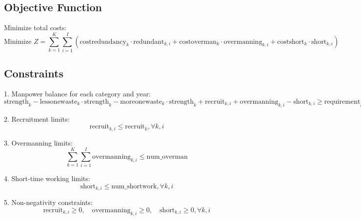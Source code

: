 \documentclass{article}
\begin{document}
\subsection*{Objective Function}
Minimize total costs:
\[
\text{Minimize } Z = \sum_{k=1}^{K} \sum_{i=1}^{I} \left( \text{costredundancy}_{k} \cdot \text{redundant}_{k,i} + \text{costoverman}_{k} \cdot \text{overmanning}_{k,i} + \text{costshort}_{k} \cdot \text{short}_{k,i} \right)
\]

\subsection*{Constraints}

1. Manpower balance for each category and year:
   \[
   \text{strength}_{k} - \text{lessonewaste}_{k} \cdot \text{strength}_{k} - \text{moreonewaste}_{k} \cdot \text{strength}_{k} + \text{recruit}_{k,i} + \text{overmanning}_{k,i} - \text{short}_{k,i} \geq \text{requirement}_{k,i}, \forall k, i
   \]

2. Recruitment limits:
   \[
   \text{recruit}_{k,i} \leq \text{recruit}_{k}, \forall k, i
   \]

3. Overmanning limits:
   \[
   \sum_{k=1}^{K} \sum_{i=1}^{I} \text{overmanning}_{k,i} \leq \text{num\_overman}
   \]

4. Short-time working limits:
   \[
   \text{short}_{k,i} \leq \text{num\_shortwork}, \forall k, i
   \]

5. Non-negativity constraints:
   \[
   \text{recruit}_{k,i} \geq 0, \quad \text{overmanning}_{k,i} \geq 0, \quad \text{short}_{k,i} \geq 0, \forall k, i
   \]
\end{document}
